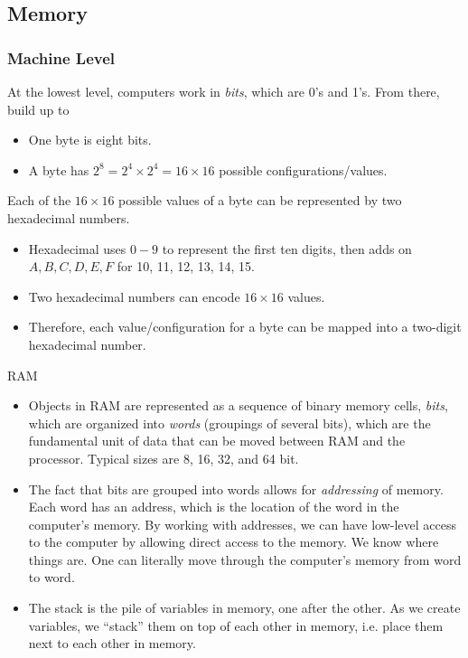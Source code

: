 \documentclass[12pt]{article}
\theoremstyle{plain}
\theoremstyle{definition}
\theoremstyle{remark}
\begin{document}
\clearpage
\subsection{Memory}

\subsubsection{Machine Level}


At the lowest level, computers work in \emph{bits}, which are 0's and
1's. From there, build up to
\begin{itemize}
  \item One byte is eight bits.
  \item A byte has $2^8=2^4\times 2^4 = 16\times 16$ possible
    configurations/values.
\end{itemize}
Each of the $16\times 16$ possible values of a byte can be represented
by two hexadecimal numbers.
\begin{itemize}
  \item Hexadecimal uses $0-9$ to represent the first ten digits, then
    adds on $A,B,C,D,E,F$ for 10, 11, 12, 13, 14, 15.
  \item Two hexadecimal numbers can encode $16\times 16$ values.
  \item Therefore, each value/configuration for a byte can be mapped
    into a two-digit hexadecimal number.
\end{itemize}
RAM
\begin{itemize}
  \item Objects in RAM are represented as a sequence of binary
    memory cells, \emph{bits}, which are organized into \emph{words}
    (groupings of several bits),
    which are the fundamental unit of data that can be moved between RAM
    and the processor.
    Typical sizes are 8, 16, 32, and 64 bit.

  \item The fact that bits are grouped into words allows for
    \emph{addressing} of memory.
    Each word has an address, which is the location of the word in the
    computer's memory.
    By working with addresses, we can have low-level access to
    the computer by allowing direct access to the memory.
    We know where things are.
    One can literally move through the computer's memory from word to
    word.

  \item The stack is the pile of variables in memory, one after the
    other.
    As we create variables, we ``stack'' them on top of each other in
    memory, i.e. place them next to each other in memory.
\end{itemize}
\end{document}
